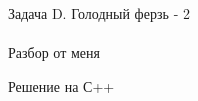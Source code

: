 {\large Задача D. Голодный ферзь - 2} 
\\
\\
Разбор от меня

\newpage
{\large Решение на С++}
\\
\\

